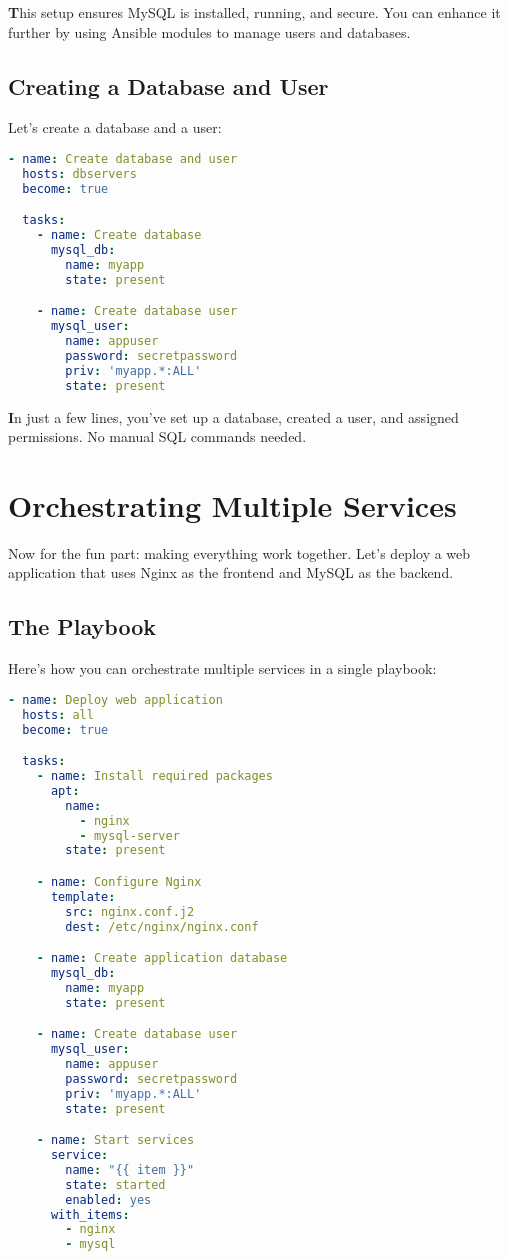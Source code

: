 \textbf{T}his setup ensures MySQL is installed, running, and secure. You can enhance it further by using Ansible modules to manage users and databases.

\subsection{Creating a Database and User}

Let's create a database and a user:
\begin{lstlisting}[language=yaml, caption=Create Database and User]
- name: Create database and user
  hosts: dbservers
  become: true

  tasks:
    - name: Create database
      mysql_db:
        name: myapp
        state: present

    - name: Create database user
      mysql_user:
        name: appuser
        password: secretpassword
        priv: 'myapp.*:ALL'
        state: present
\end{lstlisting}

\textbf{I}n just a few lines, you've set up a database, created a user, and assigned permissions. No manual SQL commands needed.


\section{Orchestrating Multiple Services}

Now for the fun part: making everything work together. Let's deploy a web application that uses Nginx as the frontend and MySQL as the backend.

\subsection{The Playbook}

Here's how you can orchestrate multiple services in a single playbook:
\begin{lstlisting}[language=yaml, caption=Orchestrating Web and Database Services]
- name: Deploy web application
  hosts: all
  become: true

  tasks:
    - name: Install required packages
      apt:
        name:
          - nginx
          - mysql-server
        state: present

    - name: Configure Nginx
      template:
        src: nginx.conf.j2
        dest: /etc/nginx/nginx.conf

    - name: Create application database
      mysql_db:
        name: myapp
        state: present

    - name: Create database user
      mysql_user:
        name: appuser
        password: secretpassword
        priv: 'myapp.*:ALL'
        state: present

    - name: Start services
      service:
        name: "{{ item }}"
        state: started
        enabled: yes
      with_items:
        - nginx
        - mysql
\end{lstlisting}

